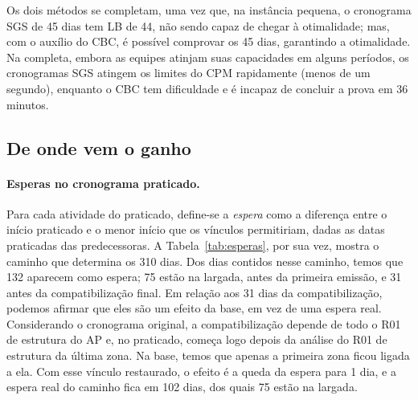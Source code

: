Os dois métodos se completam, uma vez que, na instância pequena, o cronograma SGS de
45 dias tem LB de 44, não sendo capaz de chegar à otimalidade; mas, com o auxílio do CBC, é possível comprovar os 45
dias, garantindo a otimalidade. Na completa, embora as equipes atinjam suas capacidades em alguns
períodos, os cronogramas SGS atingem os limites do CPM rapidamente (menos de um segundo), enquanto o CBC tem dificuldade e é incapaz de concluir a prova em 36 minutos.

\subsection{De onde vem o ganho}
\label{sec:origem-ganho}

\paragraph{Esperas no cronograma praticado.}
Para cada atividade do praticado, define-se a \emph{espera} como a
diferença entre o início praticado e o menor início que os vínculos
permitiriam, dadas as datas praticadas das predecessoras. A
Tabela~\ref{tab:esperas}, por sua vez, mostra o caminho que determina os 310 dias.
Dos dias contidos nesse caminho, temos que 132 aparecem como espera; 75 estão na largada, antes da
primeira emissão, e 31 antes da compatibilização final. Em relação aos 31 dias da
compatibilização, podemos afirmar que eles são um efeito da base, em vez de uma espera real. Considerando o cronograma original, a compatibilização depende de todo o R01 de
estrutura do AP e, no praticado, começa logo depois da análise do R01 de
estrutura da última zona. Na base, temos que apenas a primeira zona ficou ligada a ela. Com esse vínculo restaurado, o efeito é a queda da espera para 1 dia, e a espera real do
caminho fica em 102 dias, dos quais 75 estão na largada.


